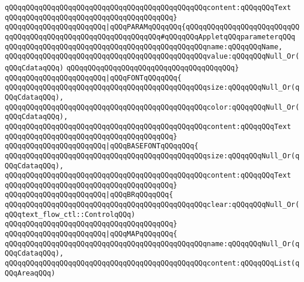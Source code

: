 \verb|qQQqqQQqqQQqqQQqqQQqqQQqqQQqqQQqqQQqqQQqqQQqqQQqcontent:qQQqqQQqText|\newline
\verb|qQQqqQQqqQQqqQQqqQQqqQQqqQQqqQQqqQQqqQQq}|\newline
\verb|qQQqqQQqqQQqqQQqqQQqqQQq|\verb#|qQQqPARAMqQQqqQQq{qQQqqQQqqQQqqQQqqQQqqQQqqQQqqQQqqQQqqQQqqQQqqQQqqQQqqQQqqQQqqQQq#\verb|#qQQqqQQqAppletqQQqparameterqQQq|\newline
\verb|qQQqqQQqqQQqqQQqqQQqqQQqqQQqqQQqqQQqqQQqqQQqqQQqname:qQQqqQQqName,|\newline
\verb|qQQqqQQqqQQqqQQqqQQqqQQqqQQqqQQqqQQqqQQqqQQqqQQqvalue:qQQqqQQqNull_Or(qQQqCdataqQQq)|\newline
\verb|qQQqqQQqqQQqqQQqqQQqqQQqqQQqqQQqqQQqqQQq}|\newline
\verb|qQQqqQQqqQQqqQQqqQQqqQQq|\verb#|qQQqFONTqQQqqQQq{#\newline
\verb|qQQqqQQqqQQqqQQqqQQqqQQqqQQqqQQqqQQqqQQqqQQqqQQqsize:qQQqqQQqNull_Or(qQQqCdataqQQq),|\newline
\verb|qQQqqQQqqQQqqQQqqQQqqQQqqQQqqQQqqQQqqQQqqQQqqQQqcolor:qQQqqQQqNull_Or(qQQqCdataqQQq),|\newline
\verb|qQQqqQQqqQQqqQQqqQQqqQQqqQQqqQQqqQQqqQQqqQQqqQQqcontent:qQQqqQQqText|\newline
\verb|qQQqqQQqqQQqqQQqqQQqqQQqqQQqqQQqqQQqqQQq}|\newline
\verb|qQQqqQQqqQQqqQQqqQQqqQQq|\verb#|qQQqBASEFONTqQQqqQQq{#\newline
\verb|qQQqqQQqqQQqqQQqqQQqqQQqqQQqqQQqqQQqqQQqqQQqqQQqsize:qQQqqQQqNull_Or(qQQqCdataqQQq),|\newline
\verb|qQQqqQQqqQQqqQQqqQQqqQQqqQQqqQQqqQQqqQQqqQQqqQQqcontent:qQQqqQQqText|\newline
\verb|qQQqqQQqqQQqqQQqqQQqqQQqqQQqqQQqqQQqqQQq}|\newline
\verb|qQQqqQQqqQQqqQQqqQQqqQQq|\verb#|qQQqBRqQQqqQQq{#\newline
\verb|qQQqqQQqqQQqqQQqqQQqqQQqqQQqqQQqqQQqqQQqqQQqqQQqclear:qQQqqQQqNull_Or(qQQqtext_flow_ctl::ControlqQQq)|\newline
\verb|qQQqqQQqqQQqqQQqqQQqqQQqqQQqqQQqqQQqqQQq}|\newline
\verb|qQQqqQQqqQQqqQQqqQQqqQQq|\verb#|qQQqMAPqQQqqQQq{#\newline
\verb|qQQqqQQqqQQqqQQqqQQqqQQqqQQqqQQqqQQqqQQqqQQqqQQqname:qQQqqQQqNull_Or(qQQqCdataqQQq),|\newline
\verb|qQQqqQQqqQQqqQQqqQQqqQQqqQQqqQQqqQQqqQQqqQQqqQQqcontent:qQQqqQQqList(qQQqAreaqQQq)|\newline
